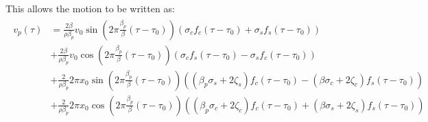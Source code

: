\documentclass{article}
\begin{document}
This allows the motion to be written as:
\begin{align}
\begin{split}
v_p (\tau) & = \frac{2 \beta}{\rho \beta_p} v_0 \sin \left( 2 \pi \frac{\beta_p}{\beta} (\tau - \tau_0) \right) (\sigma_c f_c (\tau - \tau_0) + \sigma_s f_s (\tau - \tau_0)) \\
&+ \frac{2 \beta}{\rho \beta_p} v_0 \cos \left( 2 \pi \frac{\beta_p}{\beta} (\tau - \tau_0) \right) (\sigma_c f_s (\tau - \tau_0) - \sigma_s f_c (\tau - \tau_0)) \\
&+ \frac{2}{\rho \beta_p} 2 \pi x_0 \sin \left( 2 \pi \frac{\beta_p}{\beta} (\tau - \tau_0) \right) ((\beta_p \sigma_s + 2 \zeta_s) f_c (\tau - \tau_0) - (\beta \sigma_c + 2 \zeta_c) f_s (\tau - \tau_0)) \\
&+ \frac{2}{\rho \beta_p} 2 \pi x_0 \cos \left( 2 \pi \frac{\beta_p}{\beta} (\tau - \tau_0) \right) ((\beta_p \sigma_c + 2 \zeta_c) f_c (\tau - \tau_0) + (\beta \sigma_s + 2 \zeta_s) f_s (\tau - \tau_0)) 
\end{split}
\end{align}
\end{document}
